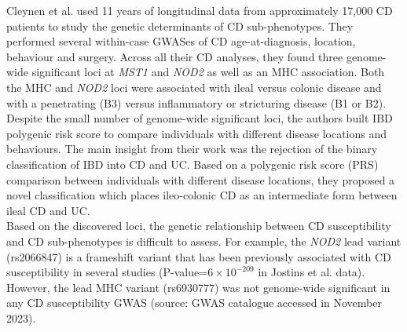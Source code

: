 Cleynen et al. \cite{Cleynen2016-ha} used 11 years of longitudinal data from approximately 17,000 CD patients to study the genetic determinants of CD sub-phenotypes. They performed several within-case GWASes of CD age-at-diagnosis, location, behaviour and surgery. Across all their CD analyses, they found three genome-wide significant loci at \textit{MST1} and \textit{NOD2} as well as an MHC association. Both the MHC and  \textit{NOD2} loci were associated with ileal versus colonic disease and with a penetrating (B3) versus inflammatory or stricturing disease (B1 or B2). Despite the small number of genome-wide significant loci, the authors built IBD polygenic risk score to compare individuals with different disease locations and behaviours. The main insight from their work was the rejection of the binary classification of IBD into CD and UC. Based on a polygenic risk score (PRS) comparison between individuals with different disease locations, they proposed a novel classification which places ileo-colonic CD as an intermediate form between ileal CD and UC. \\

Based on the discovered loci, the genetic relationship between CD susceptibility and CD sub-phenotypes is difficult to assess. For example, the \textit{NOD2} lead variant (rs2066847) is a frameshift variant that has been previously associated with CD susceptibility in several studies \cite{Barrett2008-lg,Jostins2012-ig} (P-value=$6\times10^{-209}$ in Jostins et al. data). However, the lead MHC variant (rs6930777) was not genome-wide significant in any CD susceptibility GWAS (source: GWAS catalogue accessed in November 2023). \\

